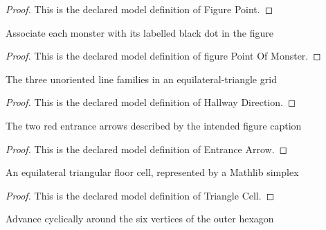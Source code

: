 \begin{proof}
  This is the declared model definition of Figure Point.
\end{proof}
\begin{definition}
  \label{def:physics:phyx-mini-0164:phyxminiproblems-problemphyxmini0164-figurepointofmonster}
  Associate each monster with its labelled black dot in the figure
\end{definition}
\begin{proof}
  This is the declared model definition of figure Point Of Monster.
\end{proof}
\begin{definition}
  \label{def:physics:phyx-mini-0164:phyxminiproblems-problemphyxmini0164-hallwaydirection}
  The three unoriented line families in an equilateral-triangle grid
\end{definition}
\begin{proof}
  This is the declared model definition of Hallway Direction.
\end{proof}
\begin{definition}
  \label{def:physics:phyx-mini-0164:phyxminiproblems-problemphyxmini0164-entrancearrow}
  The two red entrance arrows described by the intended figure caption
\end{definition}
\begin{proof}
  This is the declared model definition of Entrance Arrow.
\end{proof}
\begin{definition}
  \label{def:physics:phyx-mini-0164:phyxminiproblems-problemphyxmini0164-trianglecell}
  An equilateral triangular floor cell, represented by a Mathlib simplex
\end{definition}
\begin{proof}
  This is the declared model definition of Triangle Cell.
\end{proof}
\begin{definition}
  \label{def:physics:phyx-mini-0164:phyxminiproblems-problemphyxmini0164-nexthexagonvertex}
  Advance cyclically around the six vertices of the outer hexagon
\end{definition}
